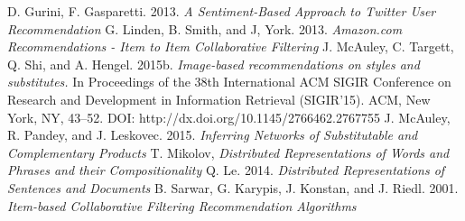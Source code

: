 \documentclass[a4paper, 11pt]{article}
\begin{document}
\begin{thebibliography}{9}
 D. Gurini, F. Gasparetti. 2013. \emph{A Sentiment-Based Approach to Twitter User Recommendation}
 G. Linden, B. Smith, and J, York. 2013. \emph{Amazon.com Recommendations - Item to Item Collaborative Filtering}
 J. McAuley, C. Targett, Q. Shi, and A. Hengel. 2015b. \emph{Image-based recommendations on styles and substitutes.} In Proceedings of the 38th International ACM SIGIR Conference on Research and Development in Information Retrieval (SIGIR’15). ACM, New York, NY, 43–52. DOI: http://dx.doi.org/10.1145/2766462.2767755
 J. McAuley, R. Pandey, and J. Leskovec. 2015. \emph{Inferring Networks of Substitutable and Complementary Products}
 T. Mikolov, \emph{Distributed Representations of Words and Phrases and their Compositionality}
 Q. Le. 2014. \emph{Distributed Representations of Sentences and Documents}
 B. Sarwar, G. Karypis, J. Konstan, and J. Riedl. 2001. \emph{Item-based Collaborative Filtering Recommendation Algorithms} 

\end{thebibliography}
\end{document}
